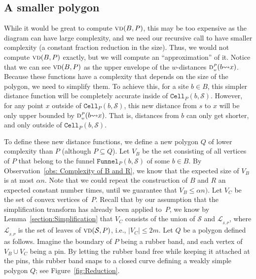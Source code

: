 \documentclass[a4paper, 11pt]{article}
\newcommand{\s}{\mathcal S}
\newcommand{\dd}[3][P]{\ensuremath{\textsc{d}_{\scriptscriptstyle w}^{\scriptscriptstyle #1}(#2 {\leadsto} #3)}}
\newcommand{\funnel}[2][P]{\ensuremath{\mathtt{Funnel}_{\scriptscriptstyle #1}(#2)}}
\newcommand{\cell}[2][P]{\ensuremath{\mathtt{Cell}_{\scriptscriptstyle #1}(#2)}}
\newcommand{\vd}[2][P]{\textsc{vd}(#2, #1)}
\newcommand{\LL}[1][\s, P]{\ensuremath{\mathcal L_{_{#1}}}}
\begin{document}
\subsection{A smaller polygon}\label{section:Smaller Polygon}
While it would be great to compute $\vd{B}$, this may be too expensive as the diagram can have large complexity, and we need our recursive call to have smaller complexity (a constant fraction reduction in the size). 
Thus, we would not compute $\vd{B}$ exactly, but we will compute an ``approximation'' of it. 
Notice that we can see $\vd{B}$ as the upper envelope of the $w$-distances $\dd{b}{x}$. 
Because these functions have a complexity that depends on the size of the polygon, we need to simplify them.
To achieve this, for a site $b\in B$, this simpler distance function will be completely accurate inside of $\cell{b, \s}$. 
However, for any point $x$ outside of $\cell{b, \s}$, this new distance from $s$ to $x$ will be only upper bounded by $\dd{b}{x}$. 
That is, distances from $b$ can only get shorter, and only outside of $\cell{b, \s}$. 

To define these new distance functions, we define a new polygon $Q$ of lower complexity than $P$ (although $P\subseteq Q$).
Let $V_B$ be the set consisting of all vertices of $P$ that belong to the funnel $\funnel{b, \s}$ of some $b\in B$.
By Observation~\ref{obs: Complexity of B and R}, we know that the expected size of $V_B$ is at most $\alpha n$. 
Note that we could repeat the construction of $B$ and $R$ an expected constant number times, until we guarantee that $V_B\leq \alpha n)$.
Let $V_C$ be the set of convex vertices of~$P$. Recall that by our assumption that the simplification transform has already been applied to~$P$, 
we know by Lemma~\ref{section:Simplification} that $V_C$ consists of the union of $\s$ and $\LL$, where $\LL$ is the set of leaves of $\vd{\s}$, i.e., $|V_C| \leq 2m$.
Let $Q$ be a polygon defined as follows. 
Imagine the boundary of $P$ being a rubber band, and each vertex of $V_B\cup V_C$ being a pin.
By letting the rubber band free while keeping it attached at the pins, this rubber band snaps to a closed curve defining a weakly simple polygon $Q$; see Figure~\ref{fig:Reduction}.
\end{document}
